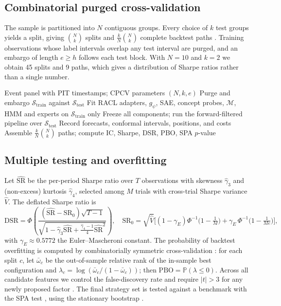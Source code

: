 \documentclass[11pt,a4paper]{article}
\theoremstyle{plain}
\theoremstyle{definition}
\theoremstyle{remark}
\newcommand{\Prob}{\mathbb{P}}
\begin{document}
\subsection{Combinatorial purged cross-validation}\label{sec:cpcv}
The sample is partitioned into $N$ contiguous groups. Every choice of $k$ test groups yields a split, giving $\binom{N}{k}$ splits and $\frac{k}{N}\binom{N}{k}$ complete backtest paths \citep{lopezdeprado2018}. Training observations whose label intervals overlap any test interval are purged, and an embargo of length $e\ge h$ follows each test block. With $N=10$ and $k=2$ we obtain 45 splits and 9 paths, which gives a distribution of Sharpe ratios rather than a single number.

\begin{algorithm}[ht]
\caption{End-to-end PIT evaluation}\label{alg:eval}
\begin{algorithmic}[1]
\Require Event panel with PIT timestamps; CPCV parameters $(N,k,e)$
  \State Purge and embargo $\mathcal{S}_{\mathrm{train}}$ against $\mathcal{S}_{\mathrm{test}}$
  \State Fit RACL adapters, $g_\psi$, SAE, concept probes, $\mathcal{M}$, HMM and experts on $\mathcal{S}_{\mathrm{train}}$ only
  \State Freeze all components; run the forward-filtered pipeline over $\mathcal{S}_{\mathrm{test}}$
  \State Record forecasts, conformal intervals, positions, and costs
\EndFor
\State Assemble $\frac{k}{N}\binom{N}{k}$ paths; compute IC, Sharpe, DSR, PBO, SPA $p$-value
\end{algorithmic}
\end{algorithm}

\subsection{Multiple testing and overfitting}
Let $\widehat{\mathrm{SR}}$ be the per-period Sharpe ratio over $T$ observations with skewness $\hat\gamma_3$ and (non-excess) kurtosis $\hat\gamma_4$, selected among $M$ trials with cross-trial Sharpe variance $\widehat{V}$. The deflated Sharpe ratio \citep{bailey2014dsr} is
\begin{equation}
  \mathrm{DSR}=\Phi\!\left(\frac{(\widehat{\mathrm{SR}}-\mathrm{SR}_0)\sqrt{T-1}}{\sqrt{1-\hat\gamma_3\widehat{\mathrm{SR}}+\frac{\hat\gamma_4-1}{4}\widehat{\mathrm{SR}}^2}}\right),\quad
  \mathrm{SR}_0=\sqrt{\widehat V}\Big[(1-\gamma_E)\Phi^{-1}\!\big(1-\tfrac1M\big)+\gamma_E\,\Phi^{-1}\!\big(1-\tfrac{1}{Me}\big)\Big],
\end{equation}
with $\gamma_E\approx0.5772$ the Euler--Mascheroni constant. The probability of backtest overfitting is computed by combinatorially symmetric cross-validation \citep{bailey2017pbo}: for each split $c$, let $\bar\omega_c$ be the out-of-sample relative rank of the in-sample best configuration and $\lambda_c=\log(\bar\omega_c/(1-\bar\omega_c))$; then $\mathrm{PBO}=\Prob(\lambda\le0)$. Across all candidate features we control the false-discovery rate \citep{benjamini1995} and require $|t|>3$ for any newly proposed factor \citep{harvey2016}. The final strategy set is tested against a benchmark with the SPA test \citep{hansen2005}, using the stationary bootstrap \citep{politis1994}.
\end{document}
